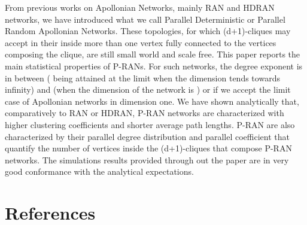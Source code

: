 \documentclass[11pt]{iopart}
\begin{document}
From previous works on Apollonian Networks, mainly RAN and HDRAN networks, we have introduced what we call Parallel Deterministic or Parallel Random Apollonian Networks. These topologies, for which (d+1)-cliques may accept in their inside more than one vertex fully connected to the vertices composing the clique, are still small world and scale free. This paper reports the main statistical properties of P-RANs. For such networks, the degree exponent is in between  
( being attained at the limit when the dimension tends towards infinity)  and  (when the dimension of the network is ) or  if we accept the limit case of Apollonian networks in dimension one. We have shown analytically that, comparatively to RAN or HDRAN, P-RAN networks are characterized with higher clustering coefficients and shorter average path lengths. P-RAN are also characterized by their parallel degree distribution and parallel coefficient that quantify the number of vertices inside the (d+1)-cliques that compose P-RAN networks. The  simulations results provided through out the paper are in very good conformance with the analytical expectations. 

\section{References}


\end{document}

